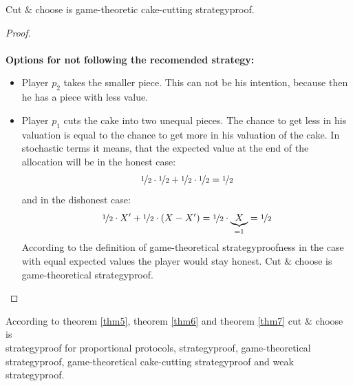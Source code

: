 \begin{lem}
\label{thm7}
Cut $\&$ choose is game-theoretic cake-cutting strategyproof.
\end{lem}
\begin{proof}
\textcolor{white}{x}\\\\
\textbf{Options for not following the recomended strategy:}
\begin{itemize}
\item Player $p_2$ takes the smaller piece. This can not be his intention, because then he has a piece with less value.
\item Player $p_1$ cuts the cake into two unequal pieces. The chance to get less in his valuation is equal to the chance to get more in his valuation of the cake. In stochastic terms it means, that the expected value at the end of the allocation will be in the honest case: $$ \nicefrac{1}{2} \cdot \nicefrac{1}{2}+\nicefrac{1}{2} \cdot \nicefrac{1}{2}=\nicefrac{1}{2} $$ and in the dishonest case: $$ \nicefrac{1}{2} \cdot X' +\nicefrac{1}{2} \cdot (X-X') =\nicefrac{1}{2} \cdot \underbrace{X}_{=1}=\nicefrac{1}{2}$$ According to the definition of game-theoretical strategyproofness in the case with equal expected values the player would stay honest. Cut $\&$ choose is game-theoretical strategyproof.
\end{itemize}
\end{proof}
\begin{bezeichnungen}
According to theorem \ref{thm5}, theorem \ref{thm6} and theorem \ref{thm7} cut $\&$ choose is\\strategyproof for proportional protocols, strategyproof, game-theoretical strategyproof, game-theoretical cake-cutting strategyproof and weak strategyproof.
\end{bezeichnungen}
